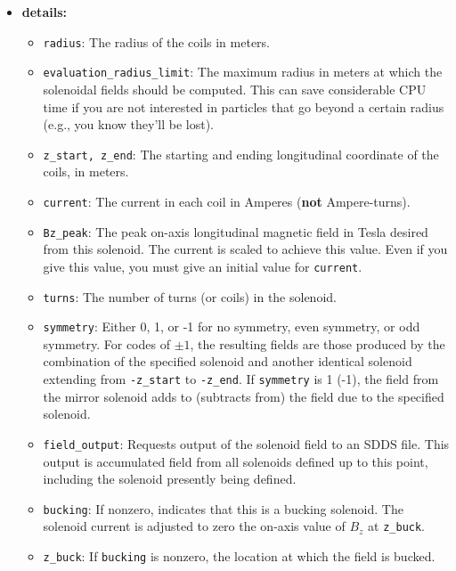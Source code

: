 \begin{itemize}
\item {\bf details:} 
\begin{itemize}
\item {\tt radius}: The radius of the coils in meters.
\item {\tt evaluation\_radius\_limit}: The maximum radius in meters at which the solenoidal
        fields should be computed.  This can save considerable CPU time if you
        are not interested in particles that go beyond a certain radius (e.g.,
        you know they'll be lost).
\item {\tt z\_start, z\_end}: The starting and ending longitudinal coordinate of the
        coils, in meters.
\item {\tt current}: The current in each coil in Amperes ({\bf not} Ampere-turns).
\item {\tt Bz\_peak}: The peak on-axis longitudinal magnetic field in Tesla desired
        from this solenoid.  The current is scaled to achieve this value.  Even if
        you give this value, you must give an initial value for {\tt current}.
\item {\tt turns}: The number of turns (or coils) in the solenoid.
\item {\tt symmetry}: Either 0, 1, or -1 for no symmetry, even symmetry, or odd
        symmetry.  For codes of $\pm 1$, the resulting fields are those produced
        by the combination of the specified solenoid and another identical solenoid
        extending from {\tt -z\_start} to {\tt -z\_end}.  If {\tt symmetry} is 1 (-1),
        the field from the mirror solenoid adds to (subtracts from) the field due
        to the specified solenoid.  
\item {\tt field\_output}: Requests output of the solenoid field to an SDDS file.
        This output is accumulated field from all solenoids defined up to this
        point, including the solenoid presently being defined.
\item {\tt bucking}: If nonzero, indicates that this is a bucking solenoid.  The solenoid current
        is adjusted to zero the on-axis value of $B_z$ at {\tt z\_buck}.
\item {\tt z\_buck}: If {\tt bucking} is nonzero, the location at which the field is bucked.
\end{itemize}

\end{itemize}

